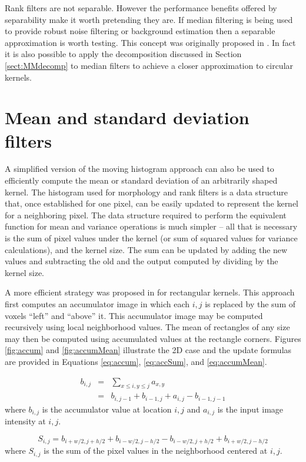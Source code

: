 \documentclass[a4paper]{InsightArticle}
\begin{document}
Rank filters are not separable. However the performance benefits
offered by separability make it worth pretending they are. If median
filtering is being used to provide robust noise filtering or
background estimation then a separable approximation is worth
testing. This concept was originally proposed in \cite{Narendra81}. In
fact it is also possible to apply the decomposition discussed in
Section \ref{sect:MMdecomp} to median filters to achieve a closer
approximation to circular kernels.

\section{Mean and standard deviation filters}
\label{sect:meanVar}
A simplified version of the moving histogram approach can also be used
to efficiently compute the mean or standard deviation of an arbitrarily shaped
kernel. The histogram used for morphology and rank filters is a data
structure that, once established for one pixel, can be easily updated
to represent the kernel for a neighboring pixel. The data structure
required to perform the equivalent function for mean and variance
operations is much simpler -- all that is necessary is the sum of
pixel values under the kernel (or sum of squared values for variance
calculations), and the kernel size. The sum can be updated by adding
the new values and subtracting the old and the output computed by
dividing by the kernel size.

A more efficient strategy was proposed in \cite{Crow84} for
rectangular kernels. This approach first computes an accumulator image
in which each $i,j$ is replaced by the sum of voxels ``left'' and
``above'' it. This accumulator image may be computed recursively using
local neighborhood values. The mean of rectangles of any size may then
be computed using accumulated values at the rectangle corners. Figures
\ref{fig:accum} and \ref{fig:accumMean} illustrate the 2D case and the
update formulas are provided in Equations \ref{eq:accum}, \ref{eq:accSum}, and
\ref{eq:accumMean}.

\begin{eqnarray}
\label{eq:accum}
b_{i,j} & = & \sum_{x \leq i, y \leq j} a_{x,y} \\ \nonumber
	& = & b_{i,j-1} + b_{i-1, j} + a_{i,j} - b_{i-1, j-1}
\end{eqnarray}
where $b_{i,j}$ is the accumulator value at location $i,j$ and $a_{i,j}$ is the input image intensity at $i,j$.

\begin{equation}
\label{eq:accSum}
S_{i,j} = b_{i+w/2,j+h/2} + b_{i-w/2,j-h/2} - b_{i-w/2,j+h/2} + b_{i+w/2,j-h/2}
\end{equation}
where $S_{i,j}$ is the sum of the pixel values in the neighborhood centered at $i,j$.
\end{document}
